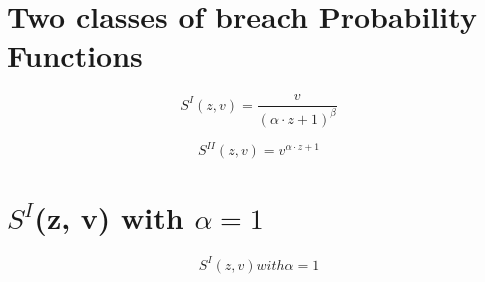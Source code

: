 \section{Two classes of breach Probability Functions}
\label{sec:Task1}
\begin{comment}
Gordon and Loeb consider two classes of breach probability functions.

1) Do the above functions capture opportunistic or strategic attackers?

2) Indicate the decision variables and parameters in these functions, and
explain their meaning with your own words.

3) Discuss what happens to SII(z; v) when v = 1. Particularly, state
what impact changes to the decision variable and parameter have on
the breach probability. Briefly argue whether or not this is realistic.

4) Recall the "expected net benefit of information security investment".
\end{comment}

\begin{equation}
S^{I}(z, v) = \frac{v}{(\alpha \cdot z + 1)^{\beta}}
\end{equation}

\begin{equation}
S^{II}(z, v) = v^{\alpha \cdot z + 1}
\end{equation}

\section{$S^{I}$(z, v) with $\alpha = 1$}
\label{sec:Task2}

\begin{equation}
S^{I}(z, v) with \alpha = 1
\end{equation}

